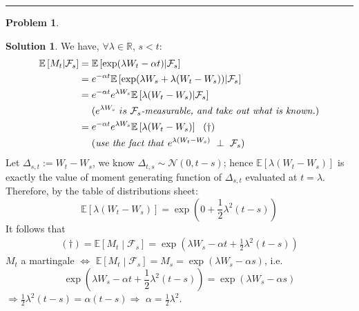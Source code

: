 \documentclass[a4paper, 10pt]{article}
\theoremstyle{definition}
\newtheorem{problem}{Problem}
\theoremstyle{hSol}
\newtheorem*{solution}{Solution}
\begin{document}
\noindent\rule{16cm}{0.4pt}
\begin{problem}
\end{problem}
\begin{solution} We have, $\forall \lambda \in \mathbb{R}$, $s<t$:
\begin{equation}
	\begin{split}
	\mathbb{E}\left[M_t\middle|\mathcal{F}_s\right] &= \mathbb{E}\left[\exp(\lambda W_t - \alpha t)\middle|\mathcal{F}_s\right]\\
	&= e^{-\alpha t}\mathbb{E}\left[\exp(\lambda W_s + \lambda (W_t - W_s))\middle|\mathcal{F}_s\right] \\
	&= e^{-\alpha t}e^{\lambda W_s}\mathbb{E}\left[\lambda (W_t - W_s)\middle|\mathcal{F}_s\right]\\
	&\quad~(e^{\lambda W_s}~is~\mathcal{F}_s\text{\textit{-measurable, and take out what is known.}})\\
	&= e^{-\alpha t}e^{\lambda W_s}\mathbb{E}\left[\lambda (W_t - W_s)\right]~~(\dag)\\
	&\quad~(\text{\textit{use the fact that }}e^{\lambda (W_t-W_s)}~\perp~\mathcal{F}_s)\\
	\end{split}
\end{equation}
Let $\Delta_{s,t} := W_t-W_s$, we know $\Delta_{t,s}\sim \mathcal{N}(0, t-s)$; hence $\mathbb{E}\left[\lambda (W_t-W_s)\right]$ is exactly the value of moment generating function of $\Delta_{s,t}$ evaluated at $t=\lambda$. Therefore, by the table of distributions sheet:
$$
\mathbb{E}\left[\lambda (W_t-W_s)\right] = \exp\left(0 + \frac{1}{2}\lambda^2(t-s)\right)
$$
It follows that
\begin{equation}
	\begin{split}
		(\dag) = \mathbb{E}\left[M_t\middle|\mathcal{F}_s\right]  = \exp\left(\lambda W_s - \alpha t + \frac{1}{2}\lambda^2(t-s)\right)
	\end{split}
\end{equation}
$M_t$ a martingale $\iff$ $\mathbb{E}\left[M_t\middle|\mathcal{F}_s\right]=M_s=\exp(\lambda W_s- \alpha s)$, i.e.
\begin{equation}
	\exp\left(\lambda W_s - \alpha t + \frac{1}{2}\lambda^2(t-s)\right) = \exp(\lambda W_s- \alpha s)
\end{equation}
$\Rightarrow \frac{1}{2}\lambda^2(t-s) = \alpha (t-s) \Rightarrow$ $\alpha = \frac{1}{2}\lambda^2$.
\end{solution}
\end{document}
